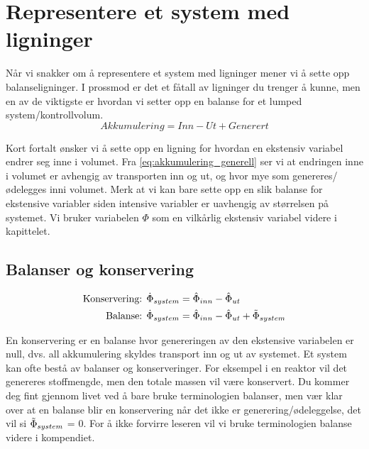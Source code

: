\clearpage
\section{Representere et system med ligninger}\label{sec:massetransport}


Når vi snakker om å representere et system med ligninger mener vi å sette opp balanseligninger. I prossmod er det et fåtall av ligninger du trenger å kunne, men en av de viktigste er hvordan vi setter opp en balanse for et lumped system/kontrollvolum.
\begin{equation}
    \label{eq:akkumulering_generell}
    Akkumulering = Inn - Ut + Generert 
\end{equation}

Kort fortalt ønsker vi å sette opp en ligning for hvordan en ekstensiv variabel endrer seg inne i volumet. Fra \cref{eq:akkumulering_generell} ser vi at endringen inne i volumet er avhengig av transporten inn og ut, og hvor mye som genereres/ødelegges inni volumet. Merk at vi kan bare sette opp en slik balanse for ekstensive variabler siden intensive variabler er uavhengig av størrelsen på systemet. Vi bruker variabelen $\Phi$ som en vilkårlig ekstensiv variabel videre i kapittelet.  

\subsection{Balanser og konservering}\label{sec:balanser_konservering}
\begin{align} \label{eq:konservering_generell}
    \text{Konservering: }\dot{\Phi}_{system} &= \hat{\Phi}_{inn} - \hat{\Phi}_{ut} \\
    \label{eq:balanse_generell}
    \text{Balanse: }\dot{\Phi}_{system} &= \hat{\Phi}_{inn} - \hat{\Phi}_{ut} + \Tilde{\Phi}_{system}
\end{align}

En konservering er en balanse hvor genereringen av den ekstensive variabelen er null, dvs. all akkumulering skyldes transport inn og ut av systemet. Et system kan ofte bestå av balanser og konserveringer. For eksempel i en reaktor vil det genereres stoffmengde, men den totale massen vil være konservert.  Du kommer deg fint gjennom livet ved å bare bruke terminologien balanser, men vær klar over at en balanse blir en konservering når det ikke er generering/ødeleggelse, det vil si $\Tilde{\Phi}_{system}$ = 0. For å ikke forvirre leseren vil vi bruke terminologien balanse videre i kompendiet.


